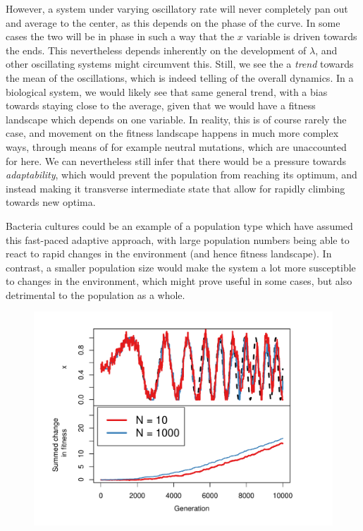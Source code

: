 \documentclass[10pt]{article}\usepackage[]{graphicx}\usepackage[]{color}
\makeatletter
\def\maxwidth{ %
  \ifdim\Gin@nat@width>\linewidth
    \linewidth
  \else
    \Gin@nat@width
  \fi
}
\theoremstyle{plain}
\makeatother
\begin{document}
\begin{multicols*}{2}
\begin{enumerate}
  However, a system under varying oscillatory rate will never completely pan out and average to the center, as this depends on the phase of the curve. In some cases the two will be in phase in such a way that the $x$ variable is driven towards the ends. This nevertheless depends inherently on the development of $\lambda$, and other oscillating systems might circumvent this. Still, we see the a \textit{trend} towards the mean of the oscillations, which is indeed telling of the overall dynamics. In a biological system, we would likely see that same general trend, with a bias towards staying close to the average, given that we would have a fitness landscape which depends on one variable. In reality, this is of course rarely the case, and movement on the fitness landscape happens in much more complex ways, through means of for example neutral mutations, which are unaccounted for here. We can nevertheless still infer that there would be a pressure towards \textit{adaptability}, which would prevent the population from reaching its optimum, and instead making it transverse intermediate state that allow for rapidly climbing towards new optima. 
  
  Bacteria cultures could be an example of a population type which have assumed this fast-paced adaptive approach, with large population numbers being able to react to rapid changes in the environment (and hence fitness landscape). In contrast, a smaller population size would make the system a lot more susceptible to changes in the environment, which might prove useful in some cases, but also detrimental to the population as a whole. 
\end{enumerate}

\begin{Schunk}
\begin{figure}[H]

{\centering \includegraphics[width=\maxwidth]{figure/twocolumn-fisherd-1} 

}
\end{figure}
\end{Schunk}
\end{multicols*}
\end{document}
